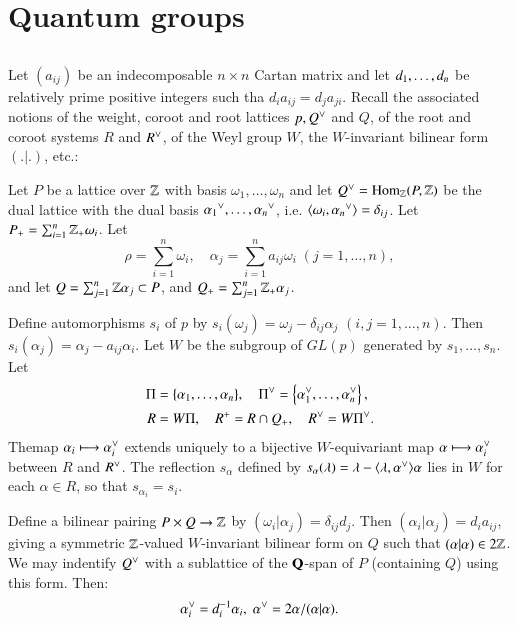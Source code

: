 \section{Quantum groups}\label{chap4-sec2}

\subsection{}\label{chap4-subsec-2.1}
Let $(a_{ij})$ be an indecomposable $n\times n $ Cartan matrix and let $d_{1}, \ldots,\break d_{n}$ be relatively prime positive integers such tha $d_{i}a_{ij} = d_{j}a_{ji}$. Recall the associated notions of the weight, coroot and root lattices $p,Q\spcheck$ and $Q$, of the root and coroot systems $R$ and $R\spcheck$, of the Weyl group $W$, the $W$-invariant bilinear form $(.|.)$, etc.:  

Let $P$ be a lattice over $\mathbb{Z}$ with basis $\omega_{1},\ldots, \omega_{n}$ and let $Q\spcheck = \Hom_{\bbZ}\break (P, \bbZ)$ be the dual lattice with the dual basis $\alpha_{1}{\spcheck}, \ldots, \alpha_{n}{\spcheck}$, i.e. $\langle \omega_{i}, \alpha_{n}{\spcheck}\rangle = \delta_{ij}$. Let $P_{+}= \sum_{i=1}^{n} \mathbb{Z}_{+}\omega_{i}$. Let 
 $$
 \rho = \sum\limits_{i=1}^{n} \omega_{i},\quad \alpha_{j} = \sum\limits_{i=1}^{n}a_{ij}\omega_{i}\;(j=1,\ldots, n),
$$
and let $Q=\sum_{j=1}^{n}\mathbb{Z}\alpha_{j} \subset P$, and $Q_{+} = \sum_{j=1}^{n}\mathbb{Z}_{+}\alpha_{j}$.

Define automorphisms $s_{i}$ of $p$ by $s_{i}(\omega_{j}) = \omega_{j}-\delta_{ij}\alpha_{j}$ $(i,j = 1, \ldots, n)$.
Then $s_{i}(\alpha_{j}) = \alpha_{j}-a_{ij}\alpha_{i}$. Let $W$ be the subgroup of $GL(p)$ generated by $s_{1}, \ldots, s_{n}$. Let
\begin{align*}
\Pi &= \{\alpha_{1}, \ldots, \alpha_{n}\}, \quad \Pi\spcheck = \left\{\alpha_{1}\spcheck, \ldots, \alpha_{n}\spcheck\right\},\\
 R &= W\Pi,\quad R^{+} = R\cap Q_{+},\quad R\spcheck = W\Pi\spcheck . 
\end{align*}
\newpage
\noindent
The\pageoriginale map $\alpha_{i}\longmapsto \alpha_{i}\spcheck$ extends uniquely to a bijective $W$-equivariant map $\alpha \longmapsto \alpha_{i}\spcheck$ between $R$ and $R\spcheck$. The reflection $s_{\alpha}$ defined by $s_{\alpha}(\lambda) = \lambda-\langle \lambda, \alpha\spcheck\rangle\alpha$ lies in $W$ for each $\alpha \in R$, so that $s_{\alpha_{i}}=s_{i}$.

Define a bilinear pairing $P\times Q \rightarrow \mathbb{Z}$ by $(\omega_{i}|\alpha_{j})=\delta_{ij}d_{j}$. Then $(\alpha_{i}|\alpha_{j}) = d_{i}a_{ij}$, giving a symmetric $\mathbb{Z}$-valued $W$-invariant bilinear form on $Q$ such that $(\alpha |\alpha) \in 2\mathbb{Z}$. We may indentify $Q\spcheck$ with a sublattice of the $\mathbf{Q}$-span of $P$ (containing $Q$) using this form. Then: 
$$
\alpha_{i}\spcheck = d_{i}^{-1}\alpha_{i}, \; \alpha\spcheck= 2\alpha/(\alpha|\alpha).
$$

